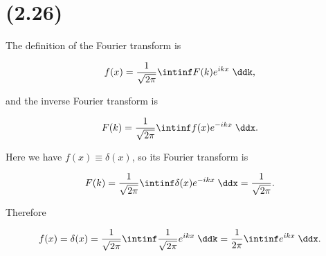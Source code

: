 \section{(2.26)}

The definition of the Fourier transform is

\begin{equation*}
    f(x) = \frac{1}{\sqrt{2\pi}}\intinf F(k) e^{ikx} \;\ddk,
\end{equation*}

and the inverse Fourier transform is

\begin{equation*}
    F(k) = \frac{1}{\sqrt{2\pi}}\intinf f(x) e^{-ikx} \;\ddx.
\end{equation*}

Here we have $f(x) \equiv \delta(x)$, so its Fourier transform is

\begin{equation*}
    F(k) = \frac{1}{\sqrt{2\pi}} \intinf \delta(x)e^{-ikx} \;\ddx = \frac{1}{\sqrt{2\pi}}.
\end{equation*}

Therefore

\begin{equation*}
    f(x) = \delta(x) = \frac{1}{\sqrt{2\pi}} \intinf \frac{1}{\sqrt{2\pi}} e^{ikx} \;\ddk = \frac{1}{2\pi} \intinf e^{ikx} \;\ddx.
\end{equation*}